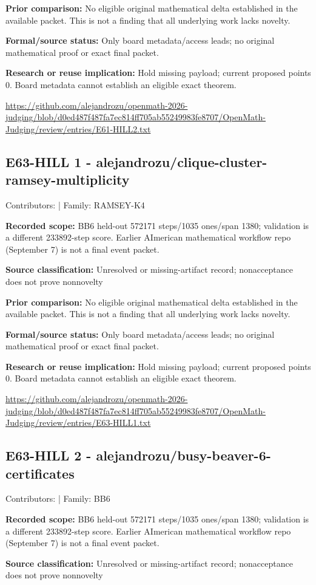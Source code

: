 \documentclass[11pt,a4paper]{article}
\begin{document}
\textbf{Prior comparison:} No eligible original mathematical delta established in the available packet. This is not a finding that all underlying work lacks novelty.

\textbf{Formal/source status:} Only board metadata/access leads; no original mathematical proof or exact final packet. 

\textbf{Research or reuse implication:} Hold missing payload; current proposed points 0. Board metadata cannot establish an eligible exact theorem.

{\small \url{https://github.com/alejandrozu/openmath-2026-judging/blob/d0ed487f487fa7ec814ff705ab55249983fe8707/OpenMath-Judging/review/entries/E61-HILL2.txt}\par}

\begin{samepage}
\subsection{E63-HILL 1  -  alejandrozu/clique-cluster-ramsey-multiplicity}
{\small Contributors:  | Family: RAMSEY-K4\par}

\textbf{Recorded scope:} BB6 held-out 572171 steps/1035 ones/span 1380; validation is a different 233892-step score. Earlier AImerican mathematical workflow repo (September 7) is not a final event packet.

\end{samepage}
\textbf{Source classification:} Unresolved or missing-artifact record; nonacceptance does not prove nonnovelty

\textbf{Prior comparison:} No eligible original mathematical delta established in the available packet. This is not a finding that all underlying work lacks novelty.

\textbf{Formal/source status:} Only board metadata/access leads; no original mathematical proof or exact final packet. 

\textbf{Research or reuse implication:} Hold missing payload; current proposed points 0. Board metadata cannot establish an eligible exact theorem.

{\small \url{https://github.com/alejandrozu/openmath-2026-judging/blob/d0ed487f487fa7ec814ff705ab55249983fe8707/OpenMath-Judging/review/entries/E63-HILL1.txt}\par}

\begin{samepage}
\subsection{E63-HILL 2  -  alejandrozu/busy-beaver-6-certificates}
{\small Contributors:  | Family: BB6\par}

\textbf{Recorded scope:} BB6 held-out 572171 steps/1035 ones/span 1380; validation is a different 233892-step score. Earlier AImerican mathematical workflow repo (September 7) is not a final event packet.

\end{samepage}
\textbf{Source classification:} Unresolved or missing-artifact record; nonacceptance does not prove nonnovelty
\end{document}
